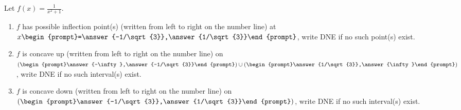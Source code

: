 \documentclass{ximera}
\author{Gregory Hartman \and Matthew Carr}
\begin{document}
\begin{exercise}




Let $f(x)=\frac{1}{x^2+1}$.
\begin{enumerate}
\item		$f$ has possible inflection point(s) (written from left to right on the number line) at $x\begin{prompt}=\answer{-1/\sqrt{3}},\answer{1/\sqrt{3}}\end{prompt}$, write DNE if no such point(s) exist.
\item		$f$ is concave up (written from left to right on the number line) on $(\begin{prompt}\answer{-\infty},\answer{-1/\sqrt{3}}\end{prompt})\cup(\begin{prompt}\answer{1/\sqrt{3}},\answer{\infty}\end{prompt})$, write DNE if no such interval(s) exist.
\item		$f$ is concave down (written from left to right on the number line) on $(\begin{prompt}\answer{-1/\sqrt{3}},\answer{1/\sqrt{3}}\end{prompt})$, write DNE if no such interval(s) exist.
\end{enumerate}

\end{exercise}
\end{document}
